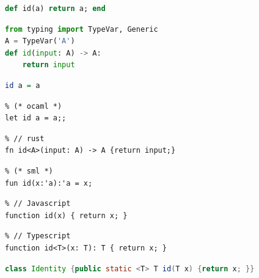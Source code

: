 \documentclass{beamer}
\begin{document}
\begin{frame}[fragile]
\begin{tiny}
\begin{lstlisting}[language=ruby]
% # ruby
def id(a) return a; end
\end{lstlisting}
  \pause

\begin{lstlisting}[language=python]
% # python
from typing import TypeVar, Generic
A = TypeVar('A')
def id(input: A) -> A:
    return input
\end{lstlisting}
  \pause

\begin{lstlisting}[language=haskell]
% -- haskell
id a = a
\end{lstlisting}
  \pause

\begin{lstlisting}
% (* ocaml *)
let id a = a;;
\end{lstlisting}
  \pause

\begin{lstlisting}
% // rust
fn id<A>(input: A) -> A {return input;}
\end{lstlisting}
  \pause

\begin{lstlisting}
% (* sml *)
fun id(x:'a):'a = x;
\end{lstlisting}
  \pause

\begin{lstlisting}
% // Javascript
function id(x) { return x; }
\end{lstlisting}
  \pause

\begin{lstlisting}
% // Typescript
function id<T>(x: T): T { return x; }
\end{lstlisting}
  \pause

\begin{lstlisting}[language=Java]
% // Java
class Identity {public static <T> T id(T x) {return x; }}
\end{lstlisting}
  \end{tiny}
\end{frame}
\end{document}
